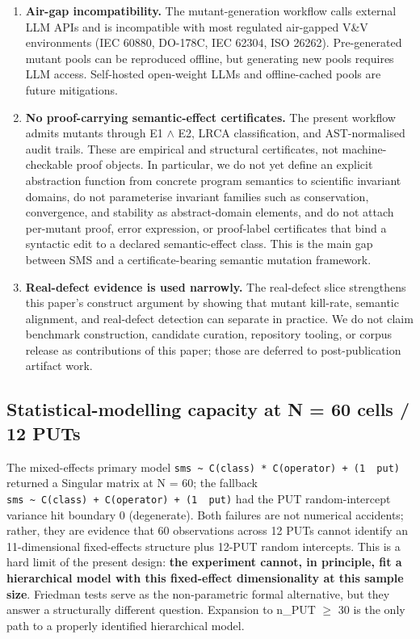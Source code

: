 \documentclass[manuscript,screen,review]{acmart}
\begin{document}
\begin{enumerate}[label=(\alph*)]
  semantic complexity. A portability study should validate SMS on
  industrial-grade multi-output PUTs.
\item
  \textbf{Air-gap incompatibility.} The mutant-generation workflow calls
  external LLM APIs and is incompatible with most regulated air-gapped
  V\&V environments (IEC 60880, DO-178C, IEC 62304, ISO 26262).
  Pre-generated mutant pools can be reproduced offline, but generating
  new pools requires LLM access. Self-hosted open-weight LLMs and
  offline-cached pools are future mitigations.
\item
  \textbf{No proof-carrying semantic-effect certificates.} The present
  workflow admits mutants through E1 $\wedge$ E2, LRCA classification, and
  AST-normalised audit trails. These are empirical and structural
  certificates, not machine-checkable proof objects. In particular, we
  do not yet define an explicit abstraction function from concrete
  program semantics to scientific invariant domains, do not parameterise
  invariant families such as conservation, convergence, and stability as
  abstract-domain elements, and do not attach per-mutant proof, error
  expression, or proof-label certificates that bind a syntactic edit to
  a declared semantic-effect class. This is the main gap between SMS and
  a certificate-bearing semantic mutation framework.
\item
  \textbf{Real-defect evidence is used narrowly.} The real-defect slice
  strengthens this paper's construct argument by showing that mutant
  kill-rate, semantic alignment, and real-defect detection can separate
  in practice. We do not claim benchmark construction, candidate curation,
  repository tooling, or corpus release as contributions of this paper;
  those are deferred to post-publication artifact work.
\end{enumerate}

\subsection{Statistical-modelling capacity at N = 60 cells / 12 PUTs}\label{statistical-modelling-capacity-at-n-60-cells-12-puts}

The mixed-effects primary model
\texttt{sms\ \textasciitilde{}\ C(class)\ *\ C(operator)\ +\ (1\ \textbar{}\ put)}
returned a Singular matrix at N = 60; the fallback
\texttt{sms\ \textasciitilde{}\ C(class)\ +\ C(operator)\ +\ (1\ \textbar{}\ put)}
had the PUT random-intercept variance hit boundary 0 (degenerate). Both
failures are not numerical accidents; rather, they are evidence that 60
observations across 12 PUTs cannot identify an 11-dimensional
fixed-effects structure plus 12-PUT random intercepts. This is a hard
limit of the present design: \textbf{the experiment cannot, in
principle, fit a hierarchical model with this fixed-effect
dimensionality at this sample size}. Friedman tests serve as the
non-parametric formal alternative, but they answer a structurally
different question. Expansion to n\_PUT $\geq$ 30 is the only path to a
properly identified hierarchical model.
\end{document}
